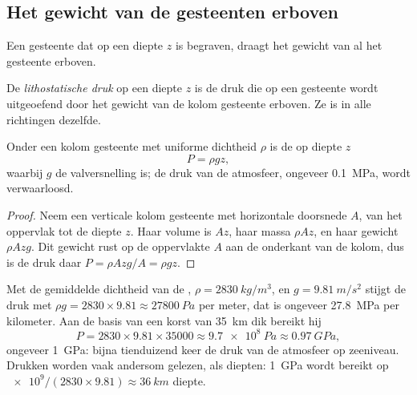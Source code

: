\subsection{Het gewicht van de gesteenten erboven}

Een gesteente dat op een diepte $z$ is begraven, draagt het gewicht van al het gesteente erboven.

\begin{definition}\label{def:g12:metamorphic-rocks:lithostatic}
De \emph{lithostatische druk} op een diepte $z$
is de druk die op een gesteente wordt uitgeoefend door het gewicht van de kolom gesteente
erboven. Ze is in alle richtingen dezelfde.
\end{definition}

\begin{proposition}\label{prop:g12:metamorphic-rocks:lithostatic}
Onder een kolom gesteente met uniforme dichtheid $\rho$ is de 
op diepte $z$
\[
  P = \rho g z ,
\]
waarbij $g$ de valversnelling is; de druk van de
atmosfeer, ongeveer \qty{0.1}{MPa}, wordt verwaarloosd.
\end{proposition}

\begin{proof}
Neem een verticale kolom gesteente met horizontale doorsnede $A$, van het
oppervlak tot de diepte $z$. Haar volume is $Az$, haar massa $\rho A z$, en
haar gewicht $\rho A z g$. Dit gewicht rust op de oppervlakte $A$ aan de onderkant van
de kolom, dus is de druk daar $P = \rho A z g / A = \rho g z$.
\end{proof}

Met de gemiddelde dichtheid van de , $\rho = \qty{2830}{kg/m^3}$,
en $g = \qty{9.81}{m/s^2}$ stijgt de druk met $\rho g = 2830 \times 9.81
\approx \qty{27800}{Pa}$ per meter, dat is ongeveer \qty{27.8}{MPa} per
kilometer. Aan de basis van een korst van \qty{35}{km} dik bereikt hij
\[
  P = 2830 \times 9.81 \times \num{35000} \approx \qty{9.7e8}{Pa} \approx
  \qty{0.97}{GPa},
\]
ongeveer \qty{1}{GPa}: bijna tienduizend keer de druk van de atmosfeer
op zeeniveau. Drukken worden vaak andersom gelezen, als diepten:
\qty{1}{GPa} wordt bereikt op $\num{e9}/(2830 \times 9.81) \approx \qty{36}{km}$
diepte.

